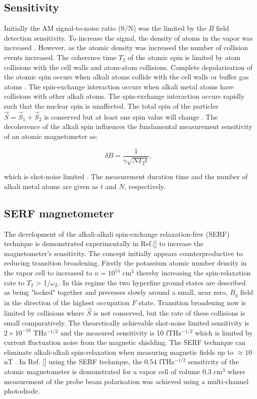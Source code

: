 \subsection{Sensitivity}
Initially the AM signal-to-noise ratio (S/N) was the limited by the $B$ field detection sensitivity. To increase the signal, the density of atoms in the vapor was increased \citep{Kitching2011AtomicReview}. However, as the atomic density was increased the number of collision events increased. The coherence time $T_{2}$ of the atomic spin is limited by atom collisions with the cell walls and atom-atom collisions. Complete depolarisation of the atomic spin occurs when alkali atoms collide with the cell walls or buffer gas atoms \citep{Budker2007OpticalMagnetometry}. The spin-exchange interaction occurs when alkali metal atoms have collisions with other alkali atoms. The spin-exchange interaction occurs rapidly such that the nuclear spin is unaffected. The total spin of the particles $\vec{S}=\vec{S}_{1}+\vec{S}_{2}$ is conserved but at least one spin value will change \citep{Happer1977EffectVapors}. The decoherence of the alkali spin influences the fundamental measurement sensitivity of an atomic magnetometer as: 

\begin{equation}
\label{eq:interactionham0}
\delta B =\frac{1}{\gamma\sqrt{N T_{2} t}},
\end{equation}

which is shot-noise limited \citep{Kominis2003AMagnetometer}. The measurement duration time and the number of alkali metal atoms are given as $t$ and $N$, respectively. 

\subsection{SERF magnetometer}
The development of the alkali-alkali spin-exchange relaxation-free (SERF) technique is demonstrated experimentally in Ref.[] to increase the magnetometer's sensitivity. The concept initially appears counterproductive to reducing transition broadening. Firstly the potassium atomic number density in the vapor cell to increased to $n = 10^{14}$ cm$^{3}$ thereby increasing the spin-relaxation rate to $T_{2}$ > 1/$\omega_{L}$. In this regime the two hyperfine ground states are described as being "locked" together and precesses slowly around a small, near zero, $B_{y}$ field in the direction of the highest occupation $F$ state. Transition broadening now is limited by collisions where $\vec{S}$ is not conserved, but the rate of these collisions is small comparatively. The theoretically achievable shot-noise limited sensitivity is $2 \times 10^{-18}$ THz$^{-1/2}$ and the measured sensitivity is 10 fTHz$^{-1/2}$ which is limited by current fluctuation noise from the magnetic shielding. The SERF technique can eliminate alkali-alkali spin-relaxation when measuring magnetic fields up to $\approx10$ nT \citep{Budker2007OpticalMagnetometry}. In Ref. [] using the SERF technique, the 0.54 fTHz$^{-1/2}$ sensitivity of the atomic magnetometer is demonstrated for a vapor cell of volume 0.3 cm$^{3}$ where measurement of the probe beam polarisation was achieved using a multi-channel photodiode. 